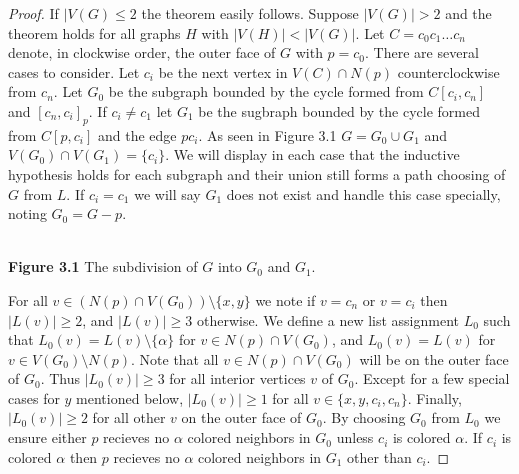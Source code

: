 \documentclass[11pt,letter]{article}
\begin{document}
\begin{proof}
If $|V(G)\le 2$ the theorem easily follows. Suppose $|V(G)|>2$ and the theorem
holds for all graphs $H$ with $|V(H)|<|V(G)|$. Let
$C=c_0c_1\ldots c_n$ denote, in clockwise order, the outer face of $G$ with $p=c_0$.
There are several cases to consider. Let $c_i$ be the next vertex in $V(C)\cap N(p)$ counterclockwise from $c_n$.
Let $G_0$ be the subgraph bounded by the cycle formed from $C[c_i,c_n]$ and $[c_n,c_i]_p$. If $c_i\ne c_1$ let
$G_1$ be the sugbraph bounded by the cycle formed from $C[p,c_i]$ and the edge $pc_i$. As seen in Figure
3.1 $G=G_0\cup G_1$ and $V(G_0)\cap V(G_1)=\{c_i\}$.
We will display in each case that the inductive hypothesis holds for each subgraph and their union still
forms a path choosing of $G$ from $L$.
If $c_i=c_1$ we will say $G_1$ does not exist and handle this case specially, noting $G_0=G-p$.

\begin{center}
\hfill\\
\textbf{Figure 3.1} The subdivision of $G$ into $G_0$ and $G_1$.
\end{center}

\noindent For all $v\in (N(p)\cap V(G_0))\setminus\{x,y\}$ we note if $v=c_n$ or $v=c_i$
then $|L(v)|\ge 2$, and $|L(v)|\ge3$ otherwise. We define a new list assignment $L_0$
such that $L_0(v)=L(v)\setminus\{\alpha\}$ for
$v\in N(p)\cap V(G_0)$, and $L_0(v)=L(v)$ for $v\in V(G_0)\setminus N(p)$. Note that all
$v\in N(p)\cap V(G_0)$ will be on the outer face of $G_0$. Thus $|L_0(v)|\ge 3$ for all interior
vertices $v$ of $G_0$. Except for a few special cases for $y$ mentioned below, $|L_0(v)|\ge 1$ for all
$v\in\{x,y,c_i,c_n\}$. Finally, $|L_0(v)|\ge2$ for all other $v$ on the outer face of $G_0$. By choosing $G_0$ from
$L_0$ we ensure either $p$ recieves no $\alpha$ colored neighbors in $G_0$ unless $c_i$ is colored $\alpha$.
If $c_i$ is colored $\alpha$ then $p$ recieves no $\alpha$ colored neighbors in $G_1$ other than $c_i$.


\end{proof}
\end{document}
